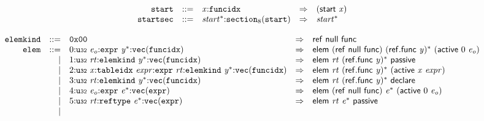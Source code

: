 \vspace{1ex}

$$
\begin{array}{@{}l@{}rrlll@{}l@{}}
& {\mathtt{start}} &::=& {\mathit{x}}{:}{\mathtt{funcidx}} &\Rightarrow& (\mathsf{start}~{\mathit{x}}) \\
& {\mathtt{startsec}} &::=& {{\mathit{start}}^\ast}{:}{{\mathtt{section}}}_{8}({\mathtt{start}}) &\Rightarrow& {{\mathit{start}}^\ast} \\
\end{array}
$$

\vspace{1ex}

$$
\begin{array}{@{}l@{}rrlll@{}l@{}}
& {\mathtt{elemkind}} &::=& \mathtt{0x00} &\Rightarrow& \mathsf{ref}~\mathsf{null}~\mathsf{func} \\
& {\mathtt{elem}} &::=& 0{:}{\mathtt{u{\scriptstyle32}}}~{\mathit{e}}_{{\mathit{o}}}{:}{\mathtt{expr}}~{{\mathit{y}}^\ast}{:}{\mathtt{vec}}({\mathtt{funcidx}}) &\Rightarrow& \mathsf{elem}~(\mathsf{ref}~\mathsf{null}~\mathsf{func})~{(\mathsf{ref.func}~{\mathit{y}})^\ast}~(\mathsf{active}~0~{\mathit{e}}_{{\mathit{o}}}) \\ &&|&
1{:}{\mathtt{u{\scriptstyle32}}}~{\mathit{rt}}{:}{\mathtt{elemkind}}~{{\mathit{y}}^\ast}{:}{\mathtt{vec}}({\mathtt{funcidx}}) &\Rightarrow& \mathsf{elem}~{\mathit{rt}}~{(\mathsf{ref.func}~{\mathit{y}})^\ast}~\mathsf{passive} \\ &&|&
2{:}{\mathtt{u{\scriptstyle32}}}~{\mathit{x}}{:}{\mathtt{tableidx}}~{\mathit{expr}}{:}{\mathtt{expr}}~{\mathit{rt}}{:}{\mathtt{elemkind}}~{{\mathit{y}}^\ast}{:}{\mathtt{vec}}({\mathtt{funcidx}}) &\Rightarrow& \mathsf{elem}~{\mathit{rt}}~{(\mathsf{ref.func}~{\mathit{y}})^\ast}~(\mathsf{active}~{\mathit{x}}~{\mathit{expr}}) \\ &&|&
3{:}{\mathtt{u{\scriptstyle32}}}~{\mathit{rt}}{:}{\mathtt{elemkind}}~{{\mathit{y}}^\ast}{:}{\mathtt{vec}}({\mathtt{funcidx}}) &\Rightarrow& \mathsf{elem}~{\mathit{rt}}~{(\mathsf{ref.func}~{\mathit{y}})^\ast}~\mathsf{declare} \\ &&|&
4{:}{\mathtt{u{\scriptstyle32}}}~{\mathit{e}}_{{\mathit{o}}}{:}{\mathtt{expr}}~{{\mathit{e}}^\ast}{:}{\mathtt{vec}}({\mathtt{expr}}) &\Rightarrow& \mathsf{elem}~(\mathsf{ref}~\mathsf{null}~\mathsf{func})~{{\mathit{e}}^\ast}~(\mathsf{active}~0~{\mathit{e}}_{{\mathit{o}}}) \\ &&|&
5{:}{\mathtt{u{\scriptstyle32}}}~{\mathit{rt}}{:}{\mathtt{reftype}}~{{\mathit{e}}^\ast}{:}{\mathtt{vec}}({\mathtt{expr}}) &\Rightarrow& \mathsf{elem}~{\mathit{rt}}~{{\mathit{e}}^\ast}~\mathsf{passive} \\ &&|&

\end{array}$$
